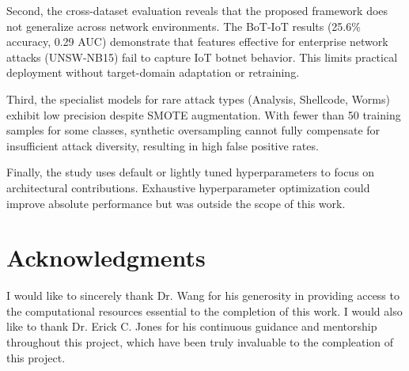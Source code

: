 \documentclass[pdflatex,sn-mathphys-num]{sn-jnl}
\theoremstyle{thmstyleone}%
\theoremstyle{thmstyletwo}%
\theoremstyle{thmstylethree}%
\begin{document}
Second, the cross-dataset evaluation reveals that the proposed framework does not generalize across network environments. The BoT-IoT results (25.6\% accuracy, 0.29 AUC) demonstrate that features effective for enterprise network attacks (UNSW-NB15) fail to capture IoT botnet behavior. This limits practical deployment without target-domain adaptation or retraining.

Third, the specialist models for rare attack types (Analysis, Shellcode, Worms) exhibit low precision despite SMOTE augmentation. With fewer than 50 training samples for some classes, synthetic oversampling cannot fully compensate for insufficient attack diversity, resulting in high false positive rates.

Finally, the study uses default or lightly tuned hyperparameters to focus on architectural contributions. Exhaustive hyperparameter optimization could improve absolute performance but was outside the scope of this work.

\newpage
\section*{Acknowledgments}
I would like to sincerely thank Dr. Wang for his generosity in providing access to the computational resources essential to the completion of this work. I would also like to thank Dr. Erick C. Jones for his continuous guidance and mentorship throughout this project, which have been truly invaluable to the compleation of this project.
\end{document}
